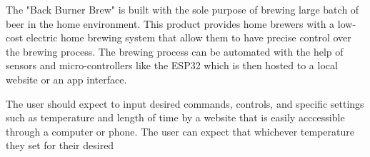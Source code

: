 The "Back Burner Brew" is built with the sole purpose of brewing large batch of beer in the home environment. This product provides home brewers with a low-cost electric home brewing system that allow them to have precise control over the brewing process. The brewing process can be automated with the help of sensors and micro-controllers like the ESP32 which is then hosted to a local website or an app interface.

The user should expect to input desired commands, controls, and specific
settings such as temperature and length of time by a website that is easily acccessible through a computer or phone. The user can expect that whichever temperature they set for their desired
